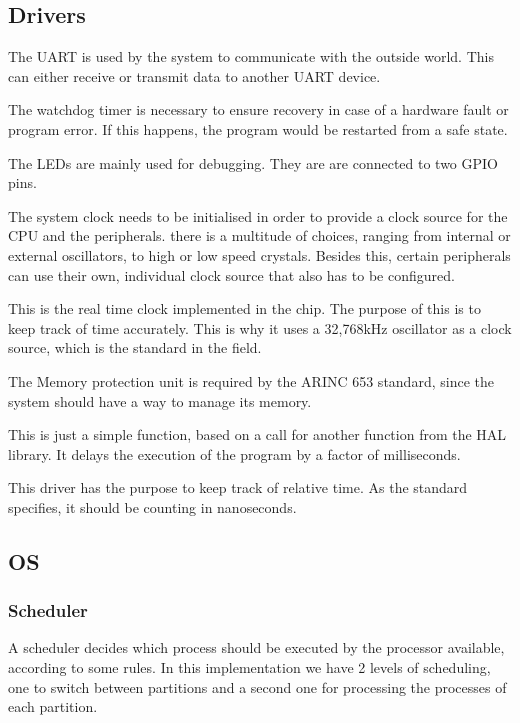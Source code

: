 \subsection{Drivers}
\begin{description}[align=left]
	\item [\textbf{UART driver}] The UART is used by the system to communicate with the outside
	world. This can either receive or transmit data to another UART device.
	\item [\textbf{Watchdog timer driver}] The watchdog timer is necessary to ensure recovery
	in case of a hardware fault or program error. If this happens, the program would be restarted
	from a safe state.
	\item [\textbf{LEDs}]The LEDs are mainly used for debugging. They are
	are connected to two GPIO pins.
	\item [\textbf{System Clock}]The system clock needs to be initialised 
	in order to provide a clock source for the CPU and the peripherals.
	there is a multitude of choices, ranging from internal or external
	oscillators, to high or low speed crystals. Besides this, certain
	peripherals can use their own, individual clock source that also has
	to be configured.
	\item [\textbf{RTC}]This is the real time clock implemented in the 
	chip. The purpose of this is to keep track of time accurately. This 
	is why it uses a 32,768kHz oscillator as a clock source, which is 
	the standard in the field.
	\item [\textbf{MPU}]The Memory protection unit is required by the
	ARINC 653 standard, since the system should have a way to manage its
	memory.
	\item [\textbf{Delay}]This is just a simple function, based on a call
	for another function from the HAL library. It delays the execution 
	of the program by a factor of milliseconds.
	\item [\textbf{Timing}]This driver has the purpose to keep track of 
	relative time. As the standard specifies, it should be counting in 
	nanoseconds.

\end{description}

\subsection{OS}
\subsubsection{Scheduler}
A scheduler decides which process should be executed by the processor available, according to some rules. In this implementation we have 2 levels of scheduling, one to switch between partitions and a second one for processing the processes of each partition.

